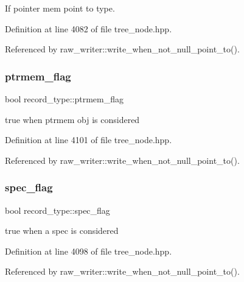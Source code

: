 If pointer mem point to type. 



Definition at line 4082 of file tree\+\_\+node.\+hpp.



Referenced by raw\+\_\+writer\+::write\+\_\+when\+\_\+not\+\_\+null\+\_\+point\+\_\+to().

\mbox{\label{structrecord__type_a218c3e670e70a9f7aa1745d556a06784}} 
\subsubsection{\texorpdfstring{ptrmem\+\_\+flag}{ptrmem\_flag}}
{\footnotesize\ttfamily bool record\+\_\+type\+::ptrmem\+\_\+flag}



true when ptrmem obj is considered 



Definition at line 4101 of file tree\+\_\+node.\+hpp.



Referenced by raw\+\_\+writer\+::write\+\_\+when\+\_\+not\+\_\+null\+\_\+point\+\_\+to().

\mbox{\label{structrecord__type_a7bf17170ab3c31e2c8e9672dbc2e9475}} 
\subsubsection{\texorpdfstring{spec\+\_\+flag}{spec\_flag}}
{\footnotesize\ttfamily bool record\+\_\+type\+::spec\+\_\+flag}



true when a spec is considered 



Definition at line 4098 of file tree\+\_\+node.\+hpp.



Referenced by raw\+\_\+writer\+::write\+\_\+when\+\_\+not\+\_\+null\+\_\+point\+\_\+to().

\mbox{\label{structrecord__type_a097e84b53523c838bdc8ff4324ba013a}} 
